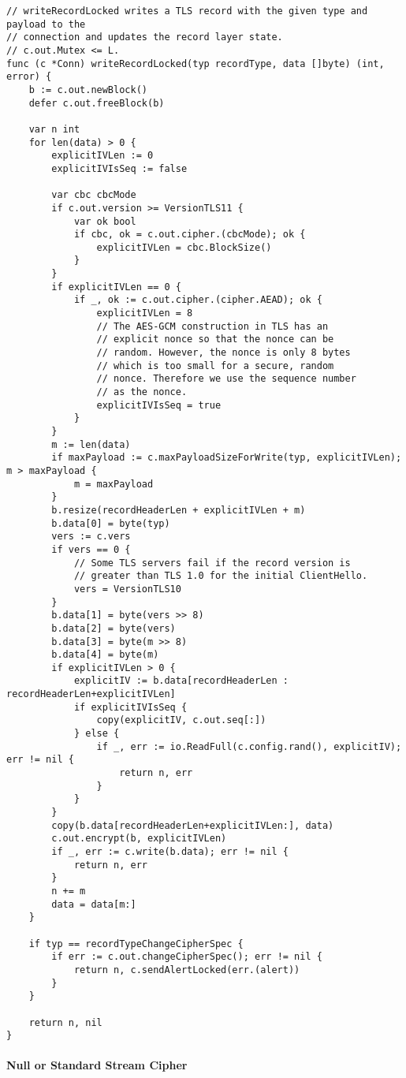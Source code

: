 \documentclass[a4paper]{ctexart}
\begin{document}
\begin{lstlisting}[frame=single, stepnumber=5, firstnumber=1, caption={TLS协议中如何写record}]
// writeRecordLocked writes a TLS record with the given type and payload to the
// connection and updates the record layer state.
// c.out.Mutex <= L.
func (c *Conn) writeRecordLocked(typ recordType, data []byte) (int, error) {
	b := c.out.newBlock()
	defer c.out.freeBlock(b)

	var n int
	for len(data) > 0 {
		explicitIVLen := 0
		explicitIVIsSeq := false

		var cbc cbcMode
		if c.out.version >= VersionTLS11 {
			var ok bool
			if cbc, ok = c.out.cipher.(cbcMode); ok {
				explicitIVLen = cbc.BlockSize()
			}
		}
		if explicitIVLen == 0 {
			if _, ok := c.out.cipher.(cipher.AEAD); ok {
				explicitIVLen = 8
				// The AES-GCM construction in TLS has an
				// explicit nonce so that the nonce can be
				// random. However, the nonce is only 8 bytes
				// which is too small for a secure, random
				// nonce. Therefore we use the sequence number
				// as the nonce.
				explicitIVIsSeq = true
			}
		}
		m := len(data)
		if maxPayload := c.maxPayloadSizeForWrite(typ, explicitIVLen); m > maxPayload {
			m = maxPayload
		}
		b.resize(recordHeaderLen + explicitIVLen + m)
		b.data[0] = byte(typ)
		vers := c.vers
		if vers == 0 {
			// Some TLS servers fail if the record version is
			// greater than TLS 1.0 for the initial ClientHello.
			vers = VersionTLS10
		}
		b.data[1] = byte(vers >> 8)
		b.data[2] = byte(vers)
		b.data[3] = byte(m >> 8)
		b.data[4] = byte(m)
		if explicitIVLen > 0 {
			explicitIV := b.data[recordHeaderLen : recordHeaderLen+explicitIVLen]
			if explicitIVIsSeq {
				copy(explicitIV, c.out.seq[:])
			} else {
				if _, err := io.ReadFull(c.config.rand(), explicitIV); err != nil {
					return n, err
				}
			}
		}
		copy(b.data[recordHeaderLen+explicitIVLen:], data)
		c.out.encrypt(b, explicitIVLen)
		if _, err := c.write(b.data); err != nil {
			return n, err
		}
		n += m
		data = data[m:]
	}

	if typ == recordTypeChangeCipherSpec {
		if err := c.out.changeCipherSpec(); err != nil {
			return n, c.sendAlertLocked(err.(alert))
		}
	}

	return n, nil
}
\end{lstlisting}

\paragraph{Null or Standard Stream Cipher}
\end{document}
